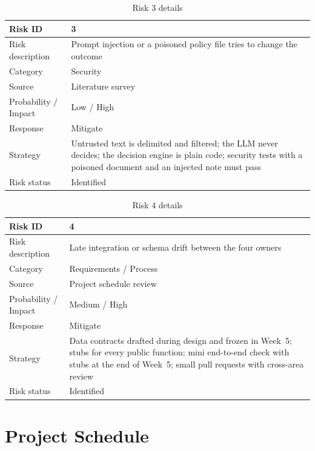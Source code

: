 \documentclass[oneside,a4paper,12pt]{report}
\begin{document}
\begin{table}[H]
\centering
\begin{tabularx}{\textwidth}{|l|X|}
\hline
Risk ID & 3 \\ \hline
Risk description & Prompt injection or a poisoned policy file tries to change the outcome \\ \hline
Category & Security \\ \hline
Source & Literature survey \cite{greshake2023indirect,zou2025poisonedrag} \\ \hline
Probability / Impact & Low / High \\ \hline
Response & Mitigate \\ \hline
Strategy & Untrusted text is delimited and filtered; the LLM never decides; the decision engine is plain code; security tests with a poisoned document and an injected note must pass \\ \hline
Risk status & Identified \\ \hline
\end{tabularx}
\caption{Risk 3 details}
\end{table}

\begin{table}[H]
\centering
\begin{tabularx}{\textwidth}{|l|X|}
\hline
Risk ID & 4 \\ \hline
Risk description & Late integration or schema drift between the four owners \\ \hline
Category & Requirements / Process \\ \hline
Source & Project schedule review \\ \hline
Probability / Impact & Medium / High \\ \hline
Response & Mitigate \\ \hline
Strategy & Data contracts drafted during design and frozen in Week~5; stubs for every public function; mini end-to-end check with stubs at the end of Week~5; small pull requests with cross-area review \\ \hline
Risk status & Identified \\ \hline
\end{tabularx}
\caption{Risk 4 details}
\end{table}

\section{Project Schedule}
\label{sec:schedule}
\end{document}
